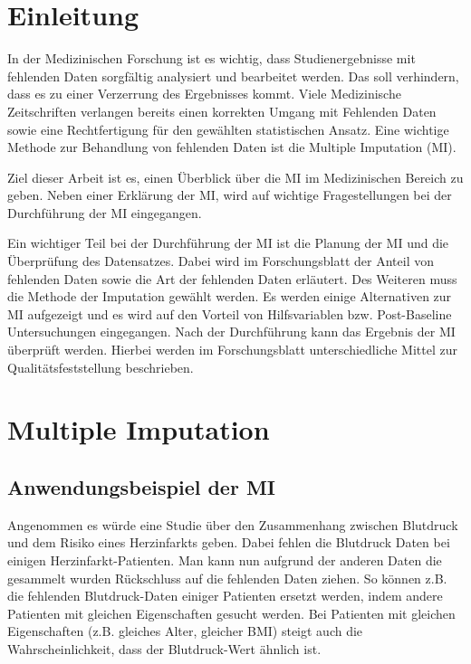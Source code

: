 \section{Einleitung}
\label{section:Introduction}

In der Medizinischen Forschung ist es wichtig, dass Studienergebnisse mit 
fehlenden Daten sorgfältig analysiert und bearbeitet werden. Das soll verhindern, dass es zu einer Verzerrung des 
Ergebnisses kommt. Viele Medizinische Zeitschriften verlangen bereits einen korrekten Umgang mit Fehlenden Daten sowie 
eine Rechtfertigung für den gewählten statistischen Ansatz. \autocite[163]{Lee2014} 
Eine wichtige Methode zur Behandlung von fehlenden Daten ist die Multiple Imputation (MI).

Ziel dieser Arbeit ist es, einen Überblick über die MI im Medizinischen Bereich zu geben. Neben einer 
Erklärung der MI, wird auf wichtige Fragestellungen bei der Durchführung der MI eingegangen.

Ein wichtiger Teil bei der Durchführung der MI ist die Planung der MI und die Überprüfung des Datensatzes. 
Dabei wird im Forschungsblatt der Anteil von fehlenden Daten sowie die Art der fehlenden Daten erläutert. 
Des Weiteren muss die Methode der Imputation gewählt werden. Es werden einige Alternativen zur MI aufgezeigt und es 
wird auf den Vorteil von Hilfsvariablen bzw. Post-Baseline Untersuchungen eingegangen. Nach der Durchführung
kann das Ergebnis der MI überprüft werden. Hierbei werden im Forschungsblatt unterschiedliche Mittel zur 
Qualitätsfeststellung beschrieben.


\section{Multiple Imputation}
\label{section:MI}

\subsection{Anwendungsbeispiel der MI}

Angenommen es würde eine Studie über den Zusammenhang zwischen Blutdruck und dem Risiko eines Herzinfarkts geben. 
Dabei fehlen die Blutdruck Daten bei einigen Herzinfarkt-Patienten. Man kann nun aufgrund der anderen Daten die 
gesammelt wurden Rückschluss auf die fehlenden Daten ziehen. So können z.B. die fehlenden Blutdruck-Daten einiger 
Patienten ersetzt werden, indem andere Patienten mit gleichen Eigenschaften gesucht werden. Bei Patienten mit gleichen 
Eigenschaften (z.B. gleiches Alter, gleicher BMI) steigt auch die Wahrscheinlichkeit, dass der Blutdruck-Wert ähnlich ist. 

